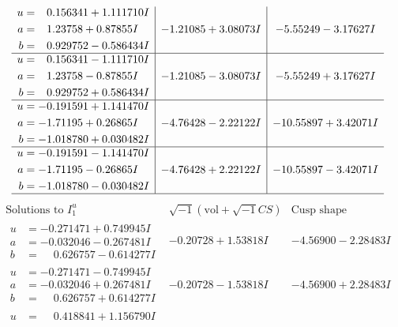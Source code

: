 \documentclass[1p]{elsarticle_modified}
\theoremstyle{definition}
\newcommand{\I}{\sqrt{-1}}
\begin{document}
$$\begin{array}{c|c|c}
\begin{aligned}
u &= \phantom{-}0.156341 + 1.111710 I \\
a &= \phantom{-}1.23758 + 0.87855 I \\
b &= \phantom{-}0.929752 - 0.586434 I\end{aligned}
 & -1.21085 + 3.08073 I & -5.55249 - 3.17627 I \\ \hline\begin{aligned}
u &= \phantom{-}0.156341 - 1.111710 I \\
a &= \phantom{-}1.23758 - 0.87855 I \\
b &= \phantom{-}0.929752 + 0.586434 I\end{aligned}
 & -1.21085 - 3.08073 I & -5.55249 + 3.17627 I \\ \hline\begin{aligned}
u &= -0.191591 + 1.141470 I \\
a &= -1.71195 + 0.26865 I \\
b &= -1.018780 + 0.030482 I\end{aligned}
 & -4.76428 - 2.22122 I & -10.55897 + 3.42071 I \\ \hline\begin{aligned}
u &= -0.191591 - 1.141470 I \\
a &= -1.71195 - 0.26865 I \\
b &= -1.018780 - 0.030482 I\end{aligned}
 & -4.76428 + 2.22122 I & -10.55897 - 3.42071 I\\
 \hline 
 \end{array}$$\newpage$$\begin{array}{c|c|c}  
\text{Solutions to }I^u_{1}& \I (\text{vol} + \sqrt{-1}CS) & \text{Cusp shape}\\
 \hline 
\begin{aligned}
u &= -0.271471 + 0.749945 I \\
a &= -0.032046 - 0.267481 I \\
b &= \phantom{-}0.626757 - 0.614277 I\end{aligned}
 & -0.20728 + 1.53818 I & -4.56900 - 2.28483 I \\ \hline\begin{aligned}
u &= -0.271471 - 0.749945 I \\
a &= -0.032046 + 0.267481 I \\
b &= \phantom{-}0.626757 + 0.614277 I\end{aligned}
 & -0.20728 - 1.53818 I & -4.56900 + 2.28483 I \\ \hline\begin{aligned}
u &= \phantom{-}0.418841 + 1.156790 I \\

\end{aligned}
\end{array}$$
\end{document}
